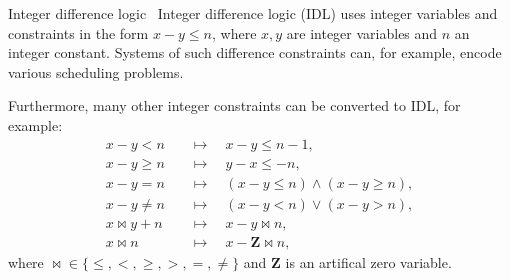 \documentclass{beamer}
\begin{document}
\begin{frame}[fragile,t]
\begin{columns}[t,onlytextwidth]
\begin{column}{0.485\textwidth}
		\begin{block}{Integer difference logic~\cite{slides}}
			Integer difference logic (IDL) uses integer variables and constraints in the form $x - y \leq n$, where $x, y$ are integer variables and $n$ an integer constant. Systems of such difference constraints can, for example, encode various scheduling problems.
			
			Furthermore, many other integer constraints can be converted to IDL, for example:
			\begin{align*}
				x - y < n \quad&\mapsto\quad x - y \leq n - 1, \\
				x - y \geq n \quad&\mapsto\quad y - x \leq -n, \\
				x - y = n \quad&\mapsto\quad (x - y \leq n) \land (x - y \geq n), \\
				x - y \neq n \quad&\mapsto\quad (x - y < n) \lor (x - y > n), \\
				x \bowtie y + n \quad&\mapsto\quad x - y \bowtie n, \\
				x \bowtie n \quad&\mapsto\quad x - \mathbf{Z} \bowtie n,
			\end{align*}
			where ${\bowtie} \in \{\leq, <, \geq, >, =, \neq\}$ and $\mathbf{Z}$ is an artifical zero variable.
		\end{block}


\end{column}
\end{columns}
\end{frame}
\end{document}
